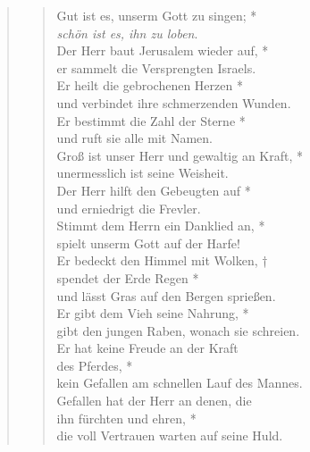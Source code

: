 \def\greinitialformat#1{{\fontsize{40}{40}\selectfont #1}}
\gresetfirstlineaboveinitial{\small \textcolor{red}{Ps 147a}}{}
\setaboveinitialseparation{0.72mm}



\vspace{0.3cm}

\begin{quote}
\begin{verse}
 Gut ist es, unserm Gott zu singen; *\\
\textit{schön ist es, ihn zu loben}. \\
\vin Der Herr baut Jerusalem wieder auf, *\\
\vin er sammelt die Versprengten Israels. \\
Er heilt die gebrochenen Herzen *\\
und verbindet ihre schmerzenden Wunden. \\
\vin Er bestimmt die Zahl der Sterne *\\
\vin und ruft sie alle mit Namen. \\
Groß ist unser Herr und gewaltig an Kraft, *\\
unermesslich ist seine Weisheit. \\
\vin Der Herr hilft den Gebeugten auf *\\
\vin und erniedrigt die Frevler.\\
Stimmt dem Herrn ein Danklied an, *\\
spielt unserm Gott auf der Harfe!\\
\vin Er bedeckt den Himmel mit Wolken, †\\
\vin spendet der Erde Regen *\\
 \vin und lässt Gras auf den Bergen sprießen. \\
Er gibt dem Vieh seine Nahrung, *\\
gibt den jungen Raben, wonach sie schreien. \\
\vin Er hat keine Freude an der Kraft \\ \vin des Pferdes, *\\
\vin kein Gefallen am schnellen Lauf des Mannes. \\
Gefallen hat der Herr an denen, die \\ ihn fürchten und ehren, *\\
die voll Vertrauen warten auf seine Huld.\\
\end{verse}

\end{quote}

